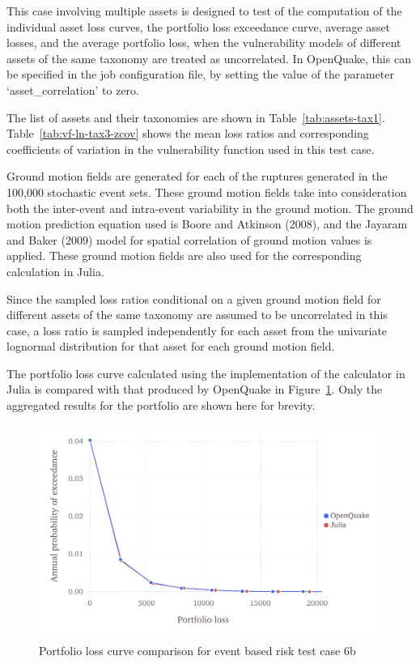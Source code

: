 This case involving multiple assets is designed to test of the computation of the individual asset loss curves, the portfolio loss exceedance curve, average asset losses, and the average portfolio loss, when the vulnerability models of different assets of the same taxonomy are treated as uncorrelated. In OpenQuake, this can be specified in the job configuration file, by setting the value of the parameter `asset\_correlation' to zero.

The list of assets and their taxonomies are shown in Table~\ref{tab:assets-tax1}. Table~\ref{tab:vf-ln-tax3-zcov} shows the mean loss ratios and corresponding coefficients of variation in the vulnerability function used in this test case.

Ground motion fields are generated for each of the ruptures generated in the 100,000 stochastic event sets. These ground motion fields take into consideration both the inter-event and intra-event variability in the ground motion. The ground motion prediction equation used is Boore and Atkinson (2008), and the Jayaram and Baker (2009) model for spatial correlation of ground motion values is applied. These ground motion fields are also used for the corresponding calculation in Julia.

Since the sampled loss ratios conditional on a given ground motion field for different assets of the same taxonomy are assumed to be uncorrelated in this case, a loss ratio is sampled independently for each asset from the univariate lognormal distribution for that asset for each ground motion field.

The portfolio loss curve calculated using the implementation of the calculator in Julia is compared with that produced by OpenQuake in Figure~\ref{fig:lc-ebr-6b}. Only the aggregated results for the portfolio are shown here for brevity.

\begin{figure}[htbp]
\centering
\includegraphics[width=12cm]{qareport/figures/fig-lc-ebr-6b}
\caption{Portfolio loss curve comparison for event based risk test case 6b}
\label{fig:lc-ebr-6b}
\end{figure}